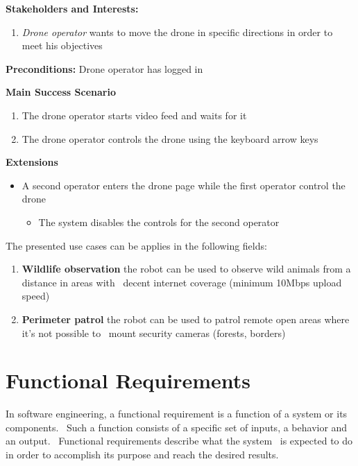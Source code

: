 \textbf{Stakeholders and Interests:}
\begin{enumerate}
    \item \textit{Drone operator} wants to move the drone in specific directions in order to meet his objectives
\end{enumerate}

\textbf{Preconditions:} Drone operator has logged in

\textbf{Main Success Scenario}
\begin{enumerate}
    \item The drone operator starts video feed and waits for it
    \item The drone operator controls the drone using the keyboard arrow keys
\end{enumerate}

\textbf{Extensions}
\begin{itemize}
    \item A second operator enters the drone page while the first operator control the drone
            \begin{itemize}
                \item The system disables the controls for the second operator
            \end{itemize}
\end{itemize}

The presented use cases can be applies in the following fields:
\begin{enumerate}
    \item \textbf{Wildlife observation} the robot can be used to observe wild animals from a distance in areas with \
        decent internet coverage (minimum 10Mbps upload speed) %
    \item \textbf{Perimeter patrol} the robot can be used to patrol remote open areas where it's not possible to \
        mount security cameras (forests, borders)
\end{enumerate}


\section{Functional Requirements}
\label{sec:functional-requirements}

In software engineering, a functional requirement is a function of a system or its components. \
Such a function consists of a specific set of inputs, a behavior and an output. \
Functional requirements describe what the system \
is expected to do in order to accomplish its purpose and reach the desired results.

